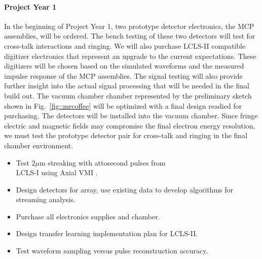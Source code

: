 \paragraph*{Project Year 1}
In the beginning of Project Year 1, two prototype detector electronics, the MCP assemblies, will be ordered.
The bench testing of these two detectors will test for cross-talk interactions and ringing.
We will also purchase LCLS-II compatible digitizer electronics that represent an upgrade to the current expectations.
These digitizers will be chosen based on the simulated waveforms and the measured impulse response of the MCP assemblies.
The signal testing will also provide further insight into the actual signal processing that will be needed in the final build out.  
The vacuum chamber chamber represented by the preliminary sketch shown in Fig.~\ref{fig::mrcoffee} will be optimized with a final design readied for purchasing. 
The detectors will be installed into the vacuum chamber.
Since fringe electric and magnetic fields may compromise the final electron energy resolution, we must test the prototype detector pair for cross-talk and ringing in the final chamber environment.  
\begin{itemize}
\item Test 2$\mu$m streaking with attosecond pulses from \\LCLS-I using Axial VMI \cite{Siqi2018}.
\item Design detectors for array, use existing data to develop algorithms for streaming analysis.
\item Purchase all electronics supplies and chamber.
\item Design transfer learning implementation plan for LCLS-II.
\item Test waveform sampling versus pulse reconstruction accuracy.
\end{itemize}

